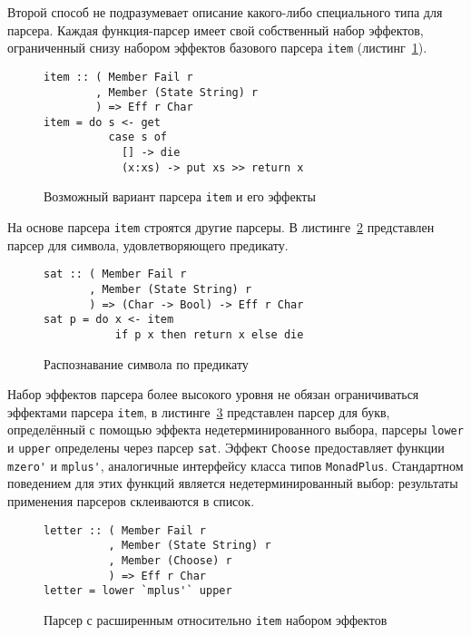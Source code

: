 Второй способ не подразумевает описание какого-либо специального типа для 
парсера. Каждая функция-парсер имеет свой собственный набор эффектов, 
ограниченный снизу набором эффектов базового парсера \lstinline{item} 
(листинг~\ref{listing:ExtEffectsItem}).

\begin{figure}[h]
\begin{lstlisting}
item :: ( Member Fail r
        , Member (State String) r
        ) => Eff r Char
item = do s <- get
          case s of
            [] -> die
            (x:xs) -> put xs >> return x
\end{lstlisting}
\caption{Возможный вариант парсера \lstinline{item} и его эффекты}
\label{listing:ExtEffectsItem}
\end{figure}

На основе парсера \lstinline{item} строятся другие парсеры. 
В листинге~\ref{listing:ExtEffectsSat} представлен парсер для символа, 
удовлетворяющего предикату.

\begin{figure}[h]
\begin{lstlisting}
sat :: ( Member Fail r
       , Member (State String) r
       ) => (Char -> Bool) -> Eff r Char
sat p = do x <- item
           if p x then return x else die
\end{lstlisting}
\caption{Распознавание символа по предикату}
\label{listing:ExtEffectsSat}
\end{figure}

Набор эффектов парсера более высокого уровня не обязан ограничиваться эффектами
парсера \lstinline{item}, в листинге~\ref{listing:ExtEffectsMpus} представлен
парсер для букв, определённый с помощью эффекта недетерминированного выбора,
парсеры \lstinline{lower} и \lstinline{upper} определены через парсер
\lstinline{sat}. Эффект \lstinline{Choose} предоставляет функции
\lstinline{mzero'} и \lstinline{mplus'}, аналогичные интерфейсу класса типов
\lstinline{MonadPlus}. Стандартном поведением для этих функций является
недетерминированный выбор: результаты применения парсеров склеиваются в список.

\begin{figure}[t]
\begin{lstlisting}
letter :: ( Member Fail r
          , Member (State String) r
          , Member (Choose) r
          ) => Eff r Char
letter = lower `mplus'` upper
\end{lstlisting}
\caption{Парсер с расширенным относительно \lstinline{item} набором эффектов}
\label{listing:ExtEffectsMpus}
\end{figure}

